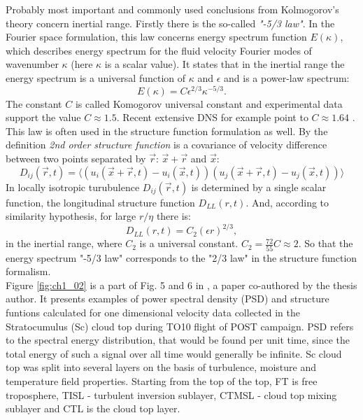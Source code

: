 \documentclass[../main.tex]{subfiles}
\begin{document}
Probably most important and commonly used conclusions from Kolmogorov's theory concern inertial range. Firstly there is the so-called \emph{"-5/3 law"}. In the Fourier space formulation, this law concerns energy spectrum function $E(\kappa)$, which describes energy spectrum for the fluid velocity  Fourier modes of wavenumber $\kappa$ (here $\kappa$ is a scalar value). It states that in the inertial range the energy spectrum is a universal function of $\kappa$  and $\epsilon$ and is a power-law spectrum:
\begin{equation}
E(\kappa)=C \epsilon^{2/3} \kappa^{-5/3}.
\label{def:Ek_inertial}
\end{equation}
The constant $C$ is called Komogorov universal constant and experimental data support the value $C \approx 1.5$. Recent extensive DNS for example point to $C \approx 1.64$ \citet{Gotoh2002}. This law is often used in the structure function formulation as well. By the definition \emph{2nd order structure function} is a covariance of velocity difference between two points separated by $\vec{r}$: $\vec{x}+\vec{r}$ and $\vec{x}$:
\begin{equation}
D_{ij}(\vec{r},t)=\langle \left(u_i(\vec{x}+\vec{r},t)-u_i(\vec{x},t)\right)\left(u_j(\vec{x}+\vec{r},t)-u_j(\vec{x},t)\right)\rangle
\label{def:struct_fun}
\end{equation}
In locally isotropic turubulence $D_{ij}(\vec{r},t)$ is determined by a single scalar function, the longitudinal structure function $D_{LL}(r,t)$. And, according to similarity hypothesis, for large $r/\eta$ there is:
\begin{equation}
D_{LL}(r,t)=C_2 (\epsilon r)^{2/3},
\label{def:struct_fun_inertial}
\end{equation}
in the inertial range, where $C_2$ is a universal constant. $C_2 = \frac{72}{55} C \approx 2$. So that the energy spectrum "-5/3 law" corresponds to the "2/3 law" in the structure function formalism.\\
Figure \ref{fig:ch1_02} is a part of Fig. 5 and 6 in \citet{Jen-LaPlante2016}, a paper co-authored by the thesis author. It presents examples of power spectral density (PSD) and structure funtions calculated for one dimensional velocity data collected in the Stratocumulus (Sc) cloud top during TO10 flight of POST campaign. PSD refers to the spectral energy distribution, that would be found per unit time, since the total energy of such a signal over all time would generally be infinite. Sc cloud top was  split into several layers on the basis of turbulence, moisture and temperature field properties. Starting from the top of the top, FT is free troposphere, TISL - turbulent inversion sublayer, CTMSL - cloud top mixing sublayer and CTL is the cloud top layer.\\
\end{document}
